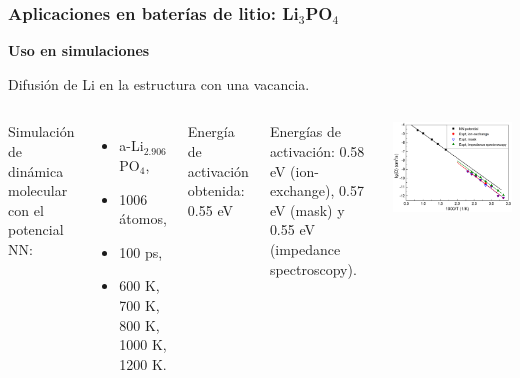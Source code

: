 \documentclass[aspectratio=169]{beamer}
\let\oldtextbf\textbf
\renewcommand{\textbf}[1]{\textcolor{nordblue}{\oldtextbf{#1}}}
\begin{document}
    \begin{frame}
        \frametitle{Aplicaciones en baterías de litio: Li$_3$PO$_4$}
            
        \textbf{Uso en simulaciones}

        Difusión de Li en la estructura con una vacancia.
        
        \begin{columns}
            Simulación de dinámica molecular con el potencial NN:
            \begin{itemize}
                \item a-Li$_{2.906}$PO$_4$,
                \item 1006 átomos,
                \item 100 ps,
                \item 600 K, 700 K, 800 K, 1000 K, 1200 K.
            \end{itemize}

            Energía de activación obtenida: 0.55 eV

            Energías de activación: 0.58 eV (ion-exchange), 0.57 eV (mask) y
            0.55 eV (impedance spectroscopy).
            \begin{center}
                \includegraphics[width=\columnwidth]{Li3PO4-MD-arrhenius.png}
            \end{center}
        \end{columns}

    \end{frame}
\end{document}
